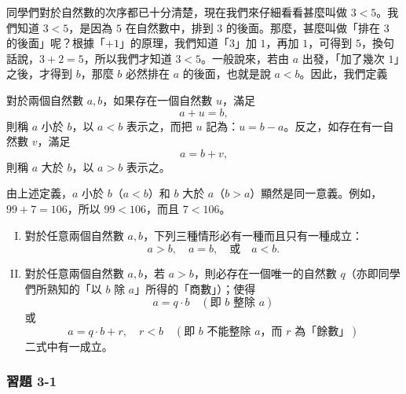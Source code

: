 同學們對於自然數的次序都已十分清楚，現在我們來仔細看看甚麼叫做 $3 < 5$。我們知道 $3 < 5$，是因為 $5$ 在自然數中，排到 $3$ 的後面。那麼，甚麼叫做「排在 $3$ 的後面」呢？根據「$+1$」的原理，我們知道「$3$」加 $1$，再加 $1$，可得到 $5$，換句話說，$3+2=5$，所以我們才知道 $3 < 5$。一般說來，若由 $a$ 出發，「加了幾次 $1$」之後，才得到 $b$，那麼 $b$ 必然排在 $a$ 的後面，也就是說 $a < b$。因此，我們定義

\begin{definition*}
對於兩個自然數 $a, b$，如果存在一個自然數 $u$，滿足
\begin{equation*}
  a + u = b,
\end{equation*}
則稱 $a$ 小於 $b$，以 $a < b$ 表示之，而把 $u$ 記為：$u = b - a$。反之，如存在有一自然數 $v$，滿足
\begin{equation*}
  a = b + v,
\end{equation*}
則稱 $a$ 大於 $b$，以 $a > b$ 表示之。
\end{definition*}

由上述定義，$a$ 小於 $b$（$a < b$）和 $b$ 大於 $a$（$b > a$）顯然是同一意義。例如，$99+7=106$，所以 $99 < 106$，而且 $7 < 106$。

\begin{enumerate}[I., start=9]
  \item 對於任意兩個自然數 $a, b$，下列三種情形必有一種而且只有一種成立：
  \begin{equation*}
    a > b, \quad a = b, \quad \text{或} \quad a < b.
  \end{equation*}
  \item 對於任意兩個自然數 $a, b$，若 $a > b$，則必存在一個唯一的自然數 $q$（亦即同學們所熟知的「以 $b$ 除 $a$」所得的「商數」）；使得
  \begin{equation*}
    a = q \cdot b \quad (\text{即 } b \text{ 整除 } a)
  \end{equation*}
  或
  \begin{equation*}
    a = q \cdot b + r, \quad r < b \quad (\text{即 } b \text{ 不能整除 } a\text{，而 } r \text{ 為「餘數」})
  \end{equation*}
  二式中有一成立。
\end{enumerate}

\subsubsection*{習題 3-1}\label{sec:ex3-1}

